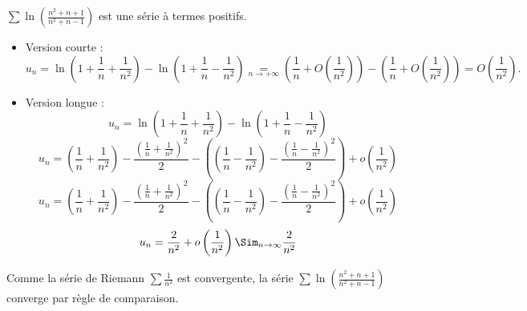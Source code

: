 \documentclass{book}
\begin{document}
\begin{Exercice}[Nature]
\begin{Correction}
\begin{enumerate}
  $\sum \ln\left(\frac{n^2+n+1}{n^2+n-1}\right)$ est une série à termes positifs. 
\begin{itemize}
\item Version courte :
$$u_n=\ln\left(1+\frac{1}{n}+\frac{1}{n^2}\right)-\ln\left(1+\frac{1}{n}-\frac{1}{n^2}\right)\underset{n\rightarrow+\infty}{=}\left(\frac{1}{n}+O\left(\frac{1}{n^2}\right)\right)-\left(\frac{1}{n}+O\left(\frac{1}{n^2}\right)\right)=O\left(\frac{1}{n^2}\right).$$
\item Version longue :
$$u_n=\ln\left(1+\frac{1}{n}+\frac{1}{n^2}\right)-\ln\left(1+\frac{1}{n}-\frac{1}{n^2}\right)$$
$$u_n=\left(\frac{1}{n}+\frac{1}{n^2}\right)-\frac{\left(\frac{1}{n}+\frac{1}{n^2}\right)^2}{2}-\left(\left(\frac{1}{n}-\frac{1}{n^2}\right)-\frac{\left(\frac{1}{n}-\frac{1}{n^2 }\right)^2}{2}\right)+ o\left(\frac{1}{n^2}\right)$$
$$u_n=\left(\frac{1}{n}+\frac{1}{n^2}\right)-\frac{\left(\frac{1}{n}+\frac{1}{n^2}\right)^2}{2}-\left(\left(\frac{1}{n}-\frac{1}{n^2}\right)-\frac{\left(\frac{1}{n}-\frac{1}{n^2 }\right)^2}{2}\right)+ o\left(\frac{1}{n^2}\right)$$
$$ u_n= \frac{2}{n^2} +o\left(\frac{1}{n^2}\right) \Sim_{n\to\infty}\frac{2}{n^2}$$
\end{itemize}  
  
Comme la série de Riemann $\sum \frac{1}{n^2}$ est convergente, la série $\sum \ln\left(\frac{n^2+n+1}{n^2+n-1}\right)$ converge par règle de comparaison.
    \end{enumerate}
\end{Correction}
\end{Exercice}
\end{document}
